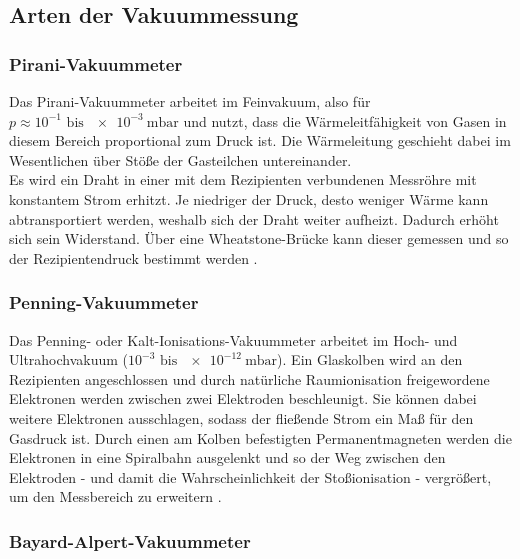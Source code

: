 \subsection{Arten der Vakuummessung}

\subsubsection{Pirani-Vakuummeter}

Das Pirani-Vakuummeter arbeitet im Feinvakuum, also für $p\approx 10^{-1}\text{ bis }\SI{e-3}{\milli\bar}$ und nutzt, dass die Wärmeleitfähigkeit von Gasen in diesem Bereich proportional zum Druck ist. Die Wärmeleitung geschieht dabei im Wesentlichen über Stöße der Gasteilchen untereinander.\\
Es wird ein Draht in einer mit dem Rezipienten verbundenen Messröhre mit konstantem Strom erhitzt. Je niedriger der Druck, desto weniger Wärme kann abtransportiert werden, weshalb sich der Draht weiter aufheizt. Dadurch erhöht sich sein Widerstand. Über eine Wheatstone-Brücke kann dieser gemessen und so der Rezipientendruck bestimmt werden \cite{Jena}.

\subsubsection{Penning-Vakuummeter}

Das Penning- oder Kalt-Ionisations-Vakuummeter arbeitet im Hoch- und Ultrahochvakuum ($10^{-3} \text{ bis } \SI{e-12}{\milli\bar}$). Ein Glaskolben wird an den Rezipienten angeschlossen und durch natürliche Raumionisation freigewordene Elektronen werden zwischen zwei Elektroden beschleunigt. Sie können dabei weitere Elektronen ausschlagen, sodass der fließende Strom ein Maß für den Gasdruck ist. Durch einen am Kolben befestigten Permanentmagneten werden die Elektronen in eine Spiralbahn ausgelenkt und so der Weg zwischen den Elektroden - und damit die Wahrscheinlichkeit der Stoßionisation - vergrößert, um den Messbereich zu erweitern \cite{Jena}.

\subsubsection{Bayard-Alpert-Vakuummeter}

